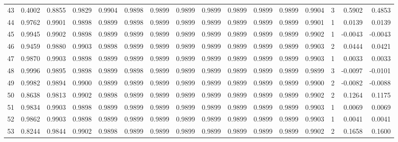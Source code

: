 \begin{tabular}{lrrrrrrrrrrrrrrr}
43  &      0.4002 &  0.8855 &  0.9829 &  0.9904 &  0.9898 &  0.9899 &  0.9899 &  0.9899 &  0.9899 &  0.9899 &   0.9899 &     0.9904 &      3 &                    0.5902 &                     0.4853 \\
44  &      0.9762 &  0.9901 &  0.9898 &  0.9899 &  0.9898 &  0.9899 &  0.9899 &  0.9899 &  0.9899 &  0.9899 &   0.9899 &     0.9901 &      1 &                    0.0139 &                     0.0139 \\
45  &      0.9945 &  0.9902 &  0.9898 &  0.9899 &  0.9899 &  0.9899 &  0.9899 &  0.9899 &  0.9899 &  0.9899 &   0.9899 &     0.9902 &      1 &                   -0.0043 &                    -0.0043 \\
46  &      0.9459 &  0.9880 &  0.9903 &  0.9898 &  0.9899 &  0.9899 &  0.9899 &  0.9899 &  0.9899 &  0.9899 &   0.9899 &     0.9903 &      2 &                    0.0444 &                     0.0421 \\
47  &      0.9870 &  0.9903 &  0.9898 &  0.9899 &  0.9899 &  0.9899 &  0.9899 &  0.9899 &  0.9899 &  0.9899 &   0.9899 &     0.9903 &      1 &                    0.0033 &                     0.0033 \\
48  &      0.9996 &  0.9895 &  0.9898 &  0.9899 &  0.9898 &  0.9899 &  0.9899 &  0.9899 &  0.9899 &  0.9899 &   0.9899 &     0.9899 &      3 &                   -0.0097 &                    -0.0101 \\
49  &      0.9982 &  0.9894 &  0.9900 &  0.9899 &  0.9899 &  0.9899 &  0.9899 &  0.9899 &  0.9899 &  0.9899 &   0.9899 &     0.9900 &      2 &                   -0.0082 &                    -0.0088 \\
50  &      0.8638 &  0.9813 &  0.9902 &  0.9898 &  0.9899 &  0.9899 &  0.9899 &  0.9899 &  0.9899 &  0.9899 &   0.9899 &     0.9902 &      2 &                    0.1264 &                     0.1175 \\
51  &      0.9834 &  0.9903 &  0.9898 &  0.9899 &  0.9899 &  0.9899 &  0.9899 &  0.9899 &  0.9899 &  0.9899 &   0.9899 &     0.9903 &      1 &                    0.0069 &                     0.0069 \\
52  &      0.9862 &  0.9903 &  0.9898 &  0.9899 &  0.9899 &  0.9899 &  0.9899 &  0.9899 &  0.9899 &  0.9899 &   0.9899 &     0.9903 &      1 &                    0.0041 &                     0.0041 \\
53  &      0.8244 &  0.9844 &  0.9902 &  0.9898 &  0.9899 &  0.9899 &  0.9899 &  0.9899 &  0.9899 &  0.9899 &   0.9899 &     0.9902 &      2 &                    0.1658 &                     0.1600 \\

\end{tabular}
